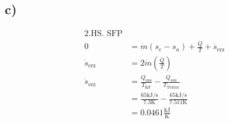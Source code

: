 

\subsection*{c)}
\begin{align*}
\text{2.HS. SFP} \\
0 &= \dot{m} (s_e - s_a) + \frac{\dot{Q}}{T} + \dot{s}_{\text{erz}} \\
\dot{s}_{\text{erz}} &= 2 \dot{m} \left( \frac{\dot{Q}}{T} \right) \\
\dot{s}_{\text{erz}} &= \frac{Q_{\text{aus}}}{T_{\text{KF}}} - \frac{Q_{\text{aus}}}{T_{\text{Textor}}} \\
&= \frac{65 \text{kJ/s}}{7.3 \text{K}} - \frac{65 \text{kJ/s}}{7.511 \text{K}} \\
&= 0.0461 \frac{\text{kJ}}{\text{K}}
\end{align*}